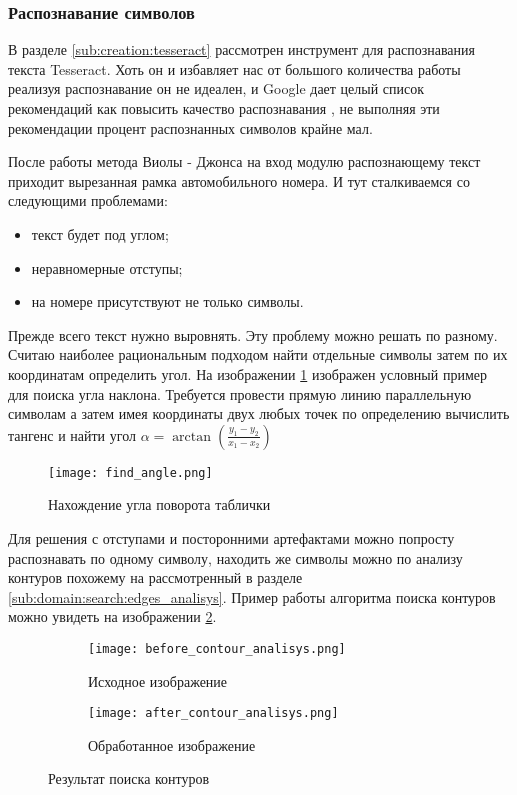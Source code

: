 \subsubsection{Распознавание символов}

В разделе \ref{sub:creation:tesseract} рассмотрен инструмент для распознавания текста Tesseract. Хоть он и избавляет нас от большого количества работы реализуя распознавание он не идеален, и Google дает целый список рекомендаций как повысить качество распознавания \cite{tesseract_impruvment}, не выполняя эти рекомендации процент распознанных символов крайне мал.

После работы метода Виолы - Джонса на вход модулю распознающему текст приходит вырезанная рамка автомобильного номера. И тут сталкиваемся со следующими проблемами:
\begin{itemize}
	\item текст будет под углом;
	\item неравномерные отступы;
	\item на номере присутствуют не только символы.
\end{itemize}

Прежде всего текст нужно выровнять. Эту проблему можно решать по разному. Считаю наиболее рациональным подходом найти отдельные символы затем по их координатам определить угол. На изображении \ref{fig:funcreq:analisys} изображен условный пример для поиска угла наклона. Требуется провести прямую линию параллельную символам а затем имея координаты двух любых точек по определению вычислить тангенс и найти угол $\alpha = \arctan(\frac{y_1 - y_2}{x_1 - x_2})$

\begin{figure}[ht]
\centering
    \texttt{[image: find\_angle.png]}  
    \caption{Нахождение угла поворота таблички}
    \label{fig:funcreq:analisys}
\end{figure}

Для решения с отступами и посторонними артефактами можно попросту распознавать по одному символу, находить же символы можно по анализу контуров похожему на рассмотренный в разделе \ref{sub:domain:search:edges_analisys}. Пример работы алгоритма поиска контуров можно увидеть на изображении \ref{fig:funcreq:analisys:contour}.

\begin{figure}[ht]
\centering
  \begin{subfigure}[b]{0.48\textwidth} 
    \centering
    \texttt{[image: before\_contour\_analisys.png]}  
    \caption{Исходное изображение}
  \end{subfigure}
  \begin{subfigure}[b]{0.48\textwidth} 
    \centering
    \texttt{[image: after\_contour\_analisys.png]}  
    \caption{Обработанное изображение}
  \end{subfigure}
  \caption{Результат поиска контуров}
  \label{fig:funcreq:analisys:contour}
\end{figure}

